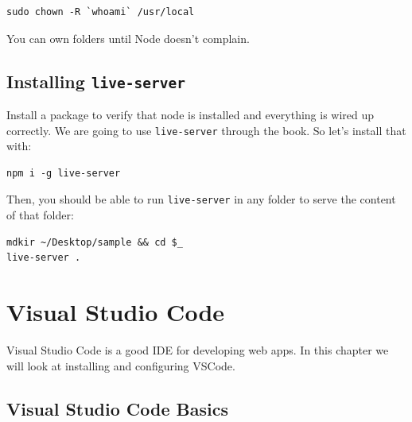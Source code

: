 \documentclass[12pt,]{article}
\begin{document}
\begin{verbatim}
sudo chown -R `whoami` /usr/local
\end{verbatim}

You can own folders until Node doesn't complain.

\subsection{\texorpdfstring{Installing
\texttt{live-server}}{Installing live-server}}\label{installing-live-server}

Install a package to verify that node is installed and everything is
wired up correctly. We are going to use \texttt{live-server} through the
book. So let's install that with:

\begin{verbatim}
npm i -g live-server
\end{verbatim}

Then, you should be able to run \texttt{live-server} in any folder to
serve the content of that folder:

\begin{verbatim}
mdkir ~/Desktop/sample && cd $_
live-server .
\end{verbatim}

\section{Visual Studio Code}\label{visual-studio-code}

Visual Studio Code is a good IDE for developing web apps. In this
chapter we will look at installing and configuring VSCode.

\subsection{Visual Studio Code Basics}\label{visual-studio-code-basics}
\end{document}
